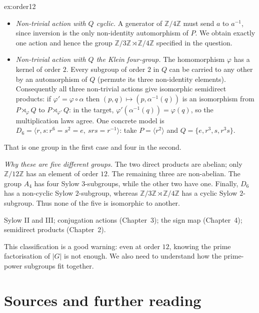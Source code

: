 \begin{solution}{ex:order12}
\begin{itemize}
\item \emph{Non-trivial action with $Q$ cyclic.} A generator of $\mathbb Z/4\mathbb Z$ must send $a$ to $a^{-1}$, since inversion is the only non-identity automorphism of $P$. We obtain exactly one action and hence the group $\mathbb Z/3\mathbb Z\rtimes\mathbb Z/4\mathbb Z$ specified in the question.

\item \emph{Non-trivial action with $Q$ the Klein four-group.} The homomorphism $\varphi$ has a kernel of order $2$. Every subgroup of order $2$ in $Q$ can be carried to any other by an automorphism of $Q$ (permute its three non-identity elements). Consequently all three non-trivial actions give isomorphic semidirect products: if $\varphi'=\varphi\circ\alpha$ then $(p,q)\mapsto(p,\alpha^{-1}(q))$ is an isomorphism from $P\rtimes_\varphi Q$ to $P\rtimes_{\varphi'}Q$: in the target, $\varphi'(\alpha^{-1}(q))=\varphi(q)$, so the multiplication laws agree. One concrete model is $D_6=\langle r,s:r^6=s^2=e,\ srs=r^{-1}\rangle$: take $P=\langle r^2\rangle$ and $Q=\{e,r^3,s,r^3s\}$.
\end{itemize}

That is one group in the first case and four in the second.

\emph{Why these are five different groups.}
The two direct products are abelian; only $\mathbb Z/12\mathbb Z$ has an element of order $12$. The remaining three are non-abelian. The group $A_4$ has four Sylow $3$-subgroups, while the other two have one. Finally, $D_6$ has a non-cyclic Sylow $2$-subgroup, whereas $\mathbb Z/3\mathbb Z\rtimes\mathbb Z/4\mathbb Z$ has a cyclic Sylow $2$-subgroup. Thus none of the five is isomorphic to another.

\tools Sylow II and III; conjugation actions (Chapter~3); the sign map (Chapter~4); semidirect products (Chapter~2).

\leads This classification is a good warning: even at order $12$, knowing the prime factorisation of $|G|$ is not enough. We also need to understand how the prime-power subgroups fit together.
\end{solution}

\section*{Sources and further reading}

